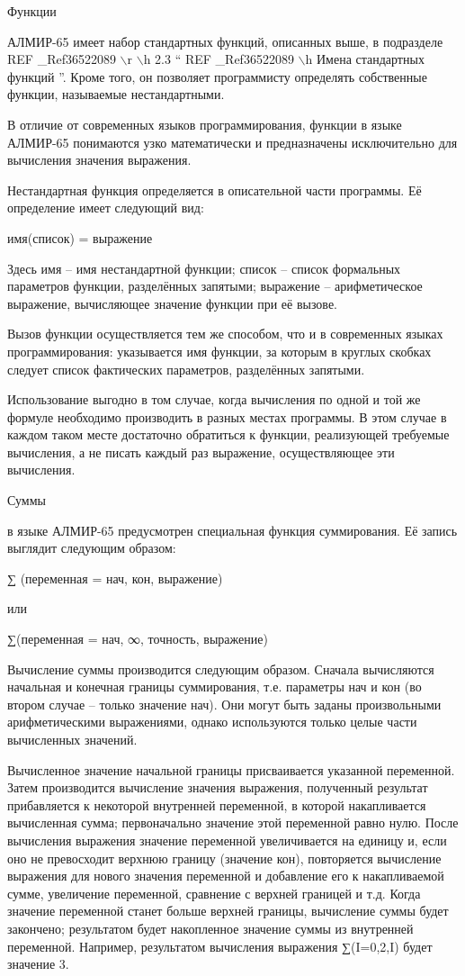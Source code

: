 \documentclass[11pt]{article}
\begin{document}
Функции

АЛМИР-65 имеет набор стандартных
функций, описанных выше, в подразделе  
REF \_Ref36522089 $\backslash$r $\backslash$h  2.3  “  REF
\_Ref36522089 $\backslash$h  Имена стандартных
функций ”. Кроме того, он позволяет
программисту определять собственные
функции, называемые нестандартными.

В отличие от современных языков
программирования, функции в языке
АЛМИР-65 понимаются узко математически
и предназначены исключительно для
вычисления значения выражения.

Нестандартная функция определяется в
описательной части программы. Её
определение имеет следующий вид:

имя(список) = выражение

Здесь имя – имя нестандартной функции;
список – список формальных параметров
функции, разделённых запятыми;
выражение – арифметическое выражение,
вычисляющее значение функции при её
вызове.

Вызов функции осуществляется тем же
способом, что и в современных языках
программирования: указывается имя
функции, за которым в круглых скобках
следует список фактических параметров,
разделённых запятыми.

Использование выгодно в том случае,
когда вычисления по одной и той же
формуле необходимо производить в
разных местах программы. В этом случае
в каждом таком месте достаточно
обратиться к функции, реализующей
требуемые вычисления, а не писать
каждый раз выражение, осуществляющее
эти вычисления.

Суммы

  в языке АЛМИР-65 предусмотрен
специальная функция суммирования. Её
запись выглядит следующим образом:

∑ (переменная = нач, кон, выражение)

или

∑(переменная = нач, ∞, точность,
выражение)

Вычисление суммы производится
следующим образом. Сначала вычисляются
начальная и конечная границы
суммирования, т.е. параметры нач и кон
(во втором случае – только значение
нач). Они могут быть заданы
произвольными арифметическими
выражениями, однако используются
только целые части вычисленных
значений.

Вычисленное значение начальной
границы присваивается указанной
переменной. Затем производится
вычисление значения выражения,
полученный результат прибавляется к
некоторой внутренней переменной, в
которой накапливается вычисленная
сумма; первоначально значение этой
переменной равно нулю. После
вычисления выражения значение
переменной увеличивается на единицу и,
если оно не превосходит верхнюю
границу (значение кон), повторяется
вычисление выражения для нового
значения переменной и добавление его к
накапливаемой сумме, увеличение
переменной, сравнение с верхней
границей и т.д. Когда значение
переменной станет больше верхней
границы, вычисление суммы будет
закончено; результатом будет
накопленное значение суммы из
внутренней переменной. Например,
результатом вычисления выражения
∑(I=0,2,I) будет значение 3.
\end{document}

